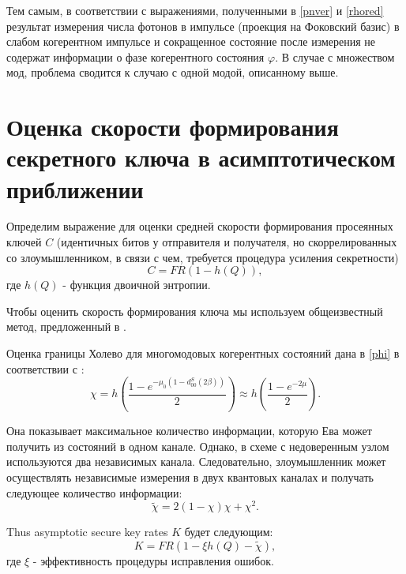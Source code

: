 Тем самым, в соответствии с выражениями, полученными в \ref{pnver} и \ref{rhored} результат измерения числа фотонов в импульсе (проекция на Фоковский базис) в слабом когерентном импульсе и сокращенное состояние после измерения не содержат информации о фазе когерентного состояния $\varphi$. В случае с множеством мод, проблема сводится к случаю с одной модой, описанному выше.
\pagebreak

\section{Оценка скорости формирования секретного ключа в асимптотическом приближении} \label{ch:ch6/sec2}

Определим выражение для оценки средней скорости формирования просеянных ключей $C$ (идентичных битов у отправителя и получателя, но скоррелированных со злоумышленником, в связи с чем, требуется процедура усиления секретности) 
\begin{equation}
    C=FR(1-h(Q)),
\end{equation}
где $h(Q)$ - функция двоичной энтропии.

Чтобы оценить скорость формирования ключа мы используем общеизвестный метод, предложенный в \cite{devetak2005distillation}.

Оценка границы Холево для многомодовых когерентных состояний дана в \ref{phi} в соответствии с \cite{kozubov2019finite}:
\begin{equation}
    \chi=h\left(\frac{1-e^{-\mu_0(1-d^S_{00}(2\beta))}}{2}\right)\approx h\left(\frac{1-e^{-2\mu}}{2}\right).
\end{equation}

Она показывает максимальное количество информации, которую Ева может получить из состояний в одном канале. Однако, в схеме с недоверенным узлом используются два независимых канала. Следовательно, злоумышленник может осуществлять независимые измерения в двух квантовых каналах и получать следующее количество информации:
\begin{equation}
    \tilde{\chi}=2(1-\chi)\chi+\chi^2.
\end{equation}

Thus asymptotic secure key rates $K$ будет следующим:
\begin{equation}
     K=FR(1-\xi h(Q)-\tilde{\chi}),
\end{equation}
где $\xi$ - эффективность процедуры исправления ошибок. 

